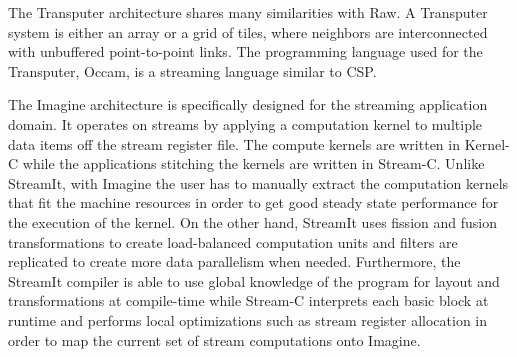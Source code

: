 The Transputer architecture shares many similarities with Raw.  A
Transputer system is either an array or a grid of tiles, where
neighbors are interconnected with unbuffered point-to-point links. The
programming language used for the Transputer, Occam, is a streaming
language similar to CSP.

The Imagine architecture is specifically designed for the streaming
application domain.  It operates on streams by applying a computation
kernel to multiple data items off the stream register file.  The
compute kernels are written in Kernel-C while the applications
stitching the kernels are written in Stream-C.  Unlike StreamIt, with
Imagine the user has to manually extract the computation kernels that
fit the machine resources in order to get good steady state
performance for the execution of the kernel.  On the other hand,
StreamIt uses fission and fusion transformations to create
load-balanced computation units and filters are replicated to create
more data parallelism when needed.  Furthermore, the StreamIt compiler
is able to use global knowledge of the program for layout and
transformations at compile-time while Stream-C interprets each basic
block at runtime and performs local optimizations such as stream
register allocation in order to map the current set of stream
computations onto Imagine.
